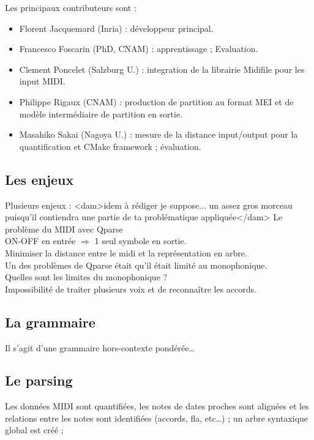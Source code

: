Les principaux contributeurs sont :
\begin{itemize}
	\item Florent Jacquemard (Inria) : développeur principal.
	\item Francesco Foscarin (PhD, CNAM) : apprentissage ; Evaluation.
	\item Clement Poncelet (Salzburg U.) : integration de la librairie Midifile
        pour les input MIDI.
	\item Philippe Rigaux (CNAM) : production de partition au format MEI et de
        modèle intermédiaire de partition en sortie.
	\item Masahiko Sakai (Nagoya U.) : mesure de la distance input/output pour
        la quantification et CMake framework ; évaluation.
\end{itemize}

\subsection*{Les enjeux}
Plusieurs enjeux : <dam>idem à rédiger je suppose... un assez gros morceau
puisqu'il contiendra une partie de ta problématique appliquée</dam>
Le problème du MIDI avec Qparse\\
ON-OFF en entrée $\Rightarrow$ 1 seul symbole en sortie.\\
Minimiser la distance entre le midi et la représentation en arbre.\\
Un des problèmes de Qparse était qu’il était limité au monophonique.\\
Quelles sont les limites du monophonique ?\\
Impossibilité de traiter plusieurs voix et de reconnaître les accords.

\subsection*{La grammaire}
Il s’agit d’une grammaire hors-contexte pondérée…

\subsection*{Le parsing}
Les données MIDI sont quantifiées, les notes de dates proches sont alignées et
les relations entre les notes sont identifiées (accords, fla, etc…) ; un arbre
syntaxique global est créé ;

